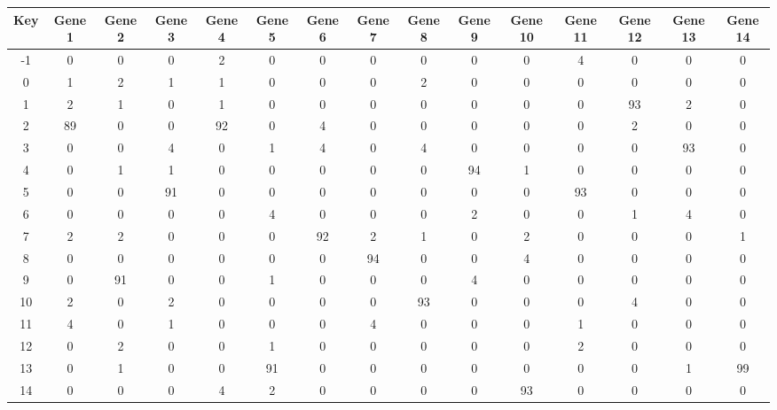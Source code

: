 \begin{tabular}{|c|c|c|c|c|c|c|c|c|c|c|c|c|c|c|}
\hline
Key & Gene 1 & Gene 2 & Gene 3 & Gene 4 & Gene 5 & Gene 6 & Gene 7 & Gene 8 & Gene 9 & Gene 10 & Gene 11 & Gene 12 & Gene 13 & Gene 14 \\
\hline
-1 & 0 & 0 & 0 & 2 & 0 & 0 & 0 & 0 & 0 & 0 & 4 & 0 & 0 & 0 \\
0 & 1 & 2 & 1 & 1 & 0 & 0 & 0 & 2 & 0 & 0 & 0 & 0 & 0 & 0 \\
1 & 2 & 1 & 0 & 1 & 0 & 0 & 0 & 0 & 0 & 0 & 0 & 93 & 2 & 0 \\
2 & 89 & 0 & 0 & 92 & 0 & 4 & 0 & 0 & 0 & 0 & 0 & 2 & 0 & 0 \\
3 & 0 & 0 & 4 & 0 & 1 & 4 & 0 & 4 & 0 & 0 & 0 & 0 & 93 & 0 \\
4 & 0 & 1 & 1 & 0 & 0 & 0 & 0 & 0 & 94 & 1 & 0 & 0 & 0 & 0 \\
5 & 0 & 0 & 91 & 0 & 0 & 0 & 0 & 0 & 0 & 0 & 93 & 0 & 0 & 0 \\
6 & 0 & 0 & 0 & 0 & 4 & 0 & 0 & 0 & 2 & 0 & 0 & 1 & 4 & 0 \\
7 & 2 & 2 & 0 & 0 & 0 & 92 & 2 & 1 & 0 & 2 & 0 & 0 & 0 & 1 \\
8 & 0 & 0 & 0 & 0 & 0 & 0 & 94 & 0 & 0 & 4 & 0 & 0 & 0 & 0 \\
9 & 0 & 91 & 0 & 0 & 1 & 0 & 0 & 0 & 4 & 0 & 0 & 0 & 0 & 0 \\
10 & 2 & 0 & 2 & 0 & 0 & 0 & 0 & 93 & 0 & 0 & 0 & 4 & 0 & 0 \\
11 & 4 & 0 & 1 & 0 & 0 & 0 & 4 & 0 & 0 & 0 & 1 & 0 & 0 & 0 \\
12 & 0 & 2 & 0 & 0 & 1 & 0 & 0 & 0 & 0 & 0 & 2 & 0 & 0 & 0 \\
13 & 0 & 1 & 0 & 0 & 91 & 0 & 0 & 0 & 0 & 0 & 0 & 0 & 1 & 99 \\
14 & 0 & 0 & 0 & 4 & 2 & 0 & 0 & 0 & 0 & 93 & 0 & 0 & 0 & 0 \\
\hline
\end{tabular}
